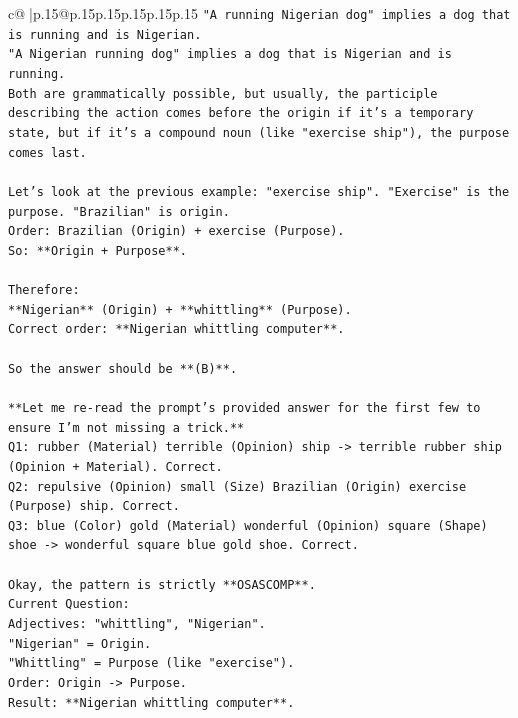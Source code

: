 \documentclass{article}
\begin{document}
{\begin{supertabular}{c@{$\;$}|p{.15\linewidth}@{}p{.15\linewidth}p{.15\linewidth}p{.15\linewidth}p{.15\linewidth}p{.15\linewidth}}
{{{\texttt{"A running Nigerian dog" implies a dog that is running and is Nigerian.} \\
\texttt{"A Nigerian running dog" implies a dog that is Nigerian and is running.} \\
\texttt{Both are grammatically possible, but usually, the participle describing the action comes before the origin if it's a temporary state, but if it's a compound noun (like "exercise ship"), the purpose comes last.} \\
\\ 
\texttt{Let's look at the previous example: "exercise ship". "Exercise" is the purpose. "Brazilian" is origin.} \\
\texttt{Order: Brazilian (Origin) + exercise (Purpose).} \\
\texttt{So: **Origin + Purpose**.} \\
\\ 
\texttt{Therefore:} \\
\texttt{**Nigerian** (Origin) + **whittling** (Purpose).} \\
\texttt{Correct order: **Nigerian whittling computer**.} \\
\\ 
\texttt{So the answer should be **(B)**.} \\
\\ 
\texttt{**Let me re{-}read the prompt's provided answer for the first few to ensure I'm not missing a trick.**} \\
\texttt{Q1: rubber (Material) terrible (Opinion) ship {-}> terrible rubber ship (Opinion + Material). Correct.} \\
\texttt{Q2: repulsive (Opinion) small (Size) Brazilian (Origin) exercise (Purpose) ship. Correct.} \\
\texttt{Q3: blue (Color) gold (Material) wonderful (Opinion) square (Shape) shoe {-}> wonderful square blue gold shoe. Correct.} \\
\\ 
\texttt{Okay, the pattern is strictly **OSASCOMP**.} \\
\texttt{Current Question:} \\
\texttt{Adjectives: "whittling", "Nigerian".} \\
\texttt{"Nigerian" = Origin.} \\
\texttt{"Whittling" = Purpose (like "exercise").} \\
\texttt{Order: Origin {-}> Purpose.} \\
\texttt{Result: **Nigerian whittling computer**.} \\
}}}
\end{supertabular}}
\end{document}
